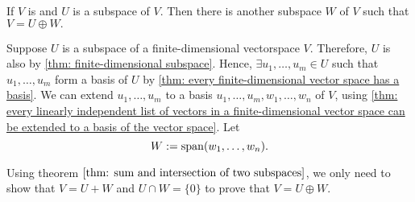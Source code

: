 \begin{thm} 
  \label{thm: every subspace of V is part of a direct sum equal to V}
  If $V$ is \fd and $U$ is a subspace of $V$. Then there is another subspace $W$ of $V$ such that $V=U \oplus W.$
\end{thm}
\begin{prf}
  Suppose $U$ is a subspace of a finite-dimensional vectorspace $V$.
  Therefore, $U$ is also \fd by \ref{thm: finite-dimensional subspace}.
  Hence, $\exists u_1, \ldots, u_m \in U $ such that $u_1, \ldots, u_m $ form a basis of $U$ by \ref{thm: every finite-dimensional vector space has a basis}.
  We can extend $u_1, \ldots, u_m$ to a basis $u_1, \ldots, u_m, w_1, \ldots, w_n$ of $V$, using \ref{thm: every linearly independent list of vectors in a finite-dimensional vector space can be extended to a basis of the vector space}. Let
  \begin{equation}
    W :=\operatorname{span} (w_1, \ldots, w_n).
  \end{equation}

  Using theorem $\ref{thm: sum and intersection of two subspaces}$, we only need to show that $V = U+W$ and $U \cap W = \{0\}$
  to prove that $V=U\oplus W$.
  \vspace{-\baselineskip}
\end{prf}